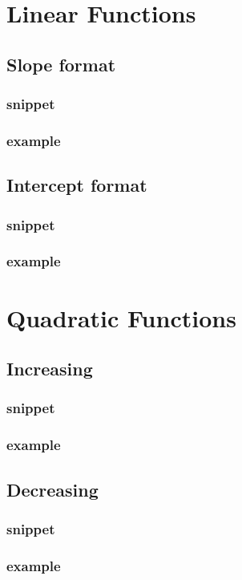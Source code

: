 \documentclass[11pt]{article}
\begin{document}
\section{Linear Functions}
	\subsection{Slope format}
		\subsubsection*{snippet}
		\subsubsection*{example}
	\subsection{Intercept format}
		\subsubsection*{snippet}
		\subsubsection*{example}
\section{Quadratic Functions}
	\subsection{Increasing}
		\subsubsection*{snippet}
		\subsubsection*{example}
	\subsection{Decreasing}
		\subsubsection*{snippet}
		\subsubsection*{example}
\end{document}
